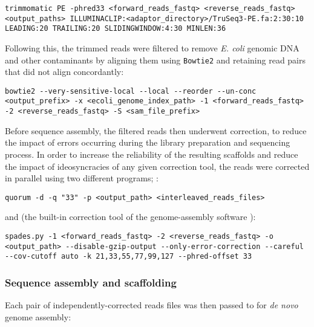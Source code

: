 \begin{lstlisting}
trimmomatic PE -phred33 <forward_reads_fastq> <reverse_reads_fastq> <output_paths> ILLUMINACLIP:<adaptor_directory>/TruSeq3-PE.fa:2:30:10 LEADING:20 TRAILING:20 SLIDINGWINDOW:4:30 MINLEN:36
\end{lstlisting}

Following this, the trimmed reads were filtered to remove \textit{E. coli} genomic DNA and other contaminants by aligning them using \lstinline{Bowtie2} \parencite{langmead2012bowtie2} and retaining read pairs that did not align concordantly:

\begin{lstlisting}
bowtie2 --very-sensitive-local --local --reorder --un-conc <output_prefix> -x <ecoli_genome_index_path> -1 <forward_reads_fastq> -2 <reverse_reads_fastq> -S <sam_file_prefix>
\end{lstlisting}


Before sequence assembly, the filtered reads then underwent correction, to reduce the impact of errors occurring during the library preparation and sequencing process. In order to increase the reliability of the resulting scaffolds and reduce the impact of ideosyncracies of any given correction tool, the reads were corrected in parallel using two different programs;  \parencite{marcais2015quorum}:

\begin{lstlisting}
quorum -d -q "33" -p <output_path> <interleaved_reads_files>
\end{lstlisting}

\noindent and  (the built-in correction tool of the  genome-assembly software \parencite{bankevich2012spades,nikolenko2013bayeshammer}):

\begin{lstlisting}
spades.py -1 <forward_reads_fastq> -2 <reverse_reads_fastq> -o <output_path> --disable-gzip-output --only-error-correction --careful --cov-cutoff auto -k 21,33,55,77,99,127 --phred-offset 33
\end{lstlisting}

\subsubsection{Sequence assembly and scaffolding}
\label{sec:methods_comp_bacs_assembly}

Each pair of independently-corrected reads files was then passed to  \parencite{bankevich2012spades} for \textit{de novo} genome assembly:

